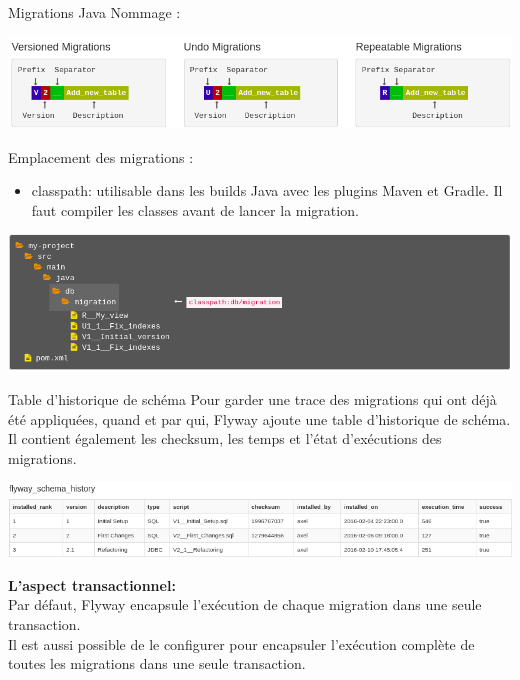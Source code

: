 \documentclass[slidestop,compress,11pt,xcolor=dvipsnames,french]{beamer}
\begin{document}
\begin{frame}{Migrations Java}
Nommage :
\begin{center}
 \includegraphics[scale=0.3]{nommage_java.png}
\end{center}

Emplacement des migrations :
\begin{itemize}
 \item classpath: utilisable dans les builds Java avec les plugins Maven et Gradle. Il faut compiler les classes avant de lancer la migration.
\end{itemize}

\begin{center}
 \includegraphics[scale=0.2,keepaspectratio=true]{locations_java.png}
\end{center}

\end{frame}

\begin{frame}{Table d'historique de schéma}
Pour garder une trace des migrations qui ont déjà été appliquées, quand et par qui, Flyway ajoute une table d'historique de schéma. Il contient également les checksum, les temps et l'état d'exécutions des migrations.
\begin{center}
 \includegraphics[scale=0.3,keepaspectratio=true]{schema_history_table.png}
\end{center}

\textbf{L'aspect transactionnel:} \\
Par défaut, Flyway encapsule l'exécution de chaque migration dans une seule transaction.\\
Il est aussi possible de le configurer pour encapsuler l'exécution complète de toutes les migrations dans une seule transaction.                                                                            

\end{frame}
\end{document}

